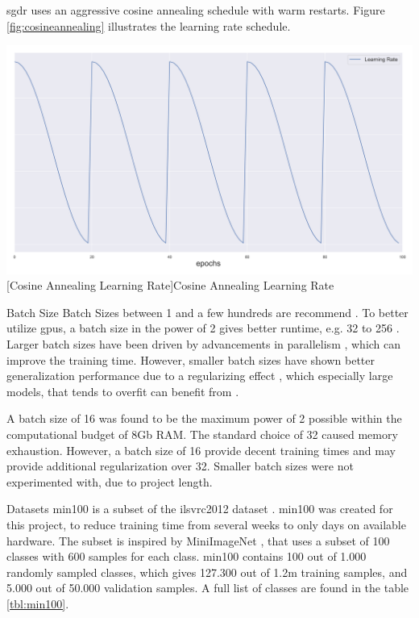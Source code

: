 \begin{enumdescript}
\begin{enumdescript}
		\gls{sgdr} uses an aggressive cosine annealing schedule with warm restarts. Figure \ref{fig:cosineannealing} illustrates the learning rate schedule.
		
		\begin{minipage}[t]{\linewidth}
			\centering
			\includegraphics[width=.7\linewidth]{figures/lr.png}
			[Cosine Annealing Learning Rate]{Cosine Annealing Learning Rate} 
			\label{fig:cosineannealing}
		\end{minipage}
		
		\item[Batch Size] Batch Sizes between 1 and a few hundreds are recommend \cite{bengio_practical_2012}. To better utilize \gls{gpu}s, a batch size in the power of 2 gives better runtime, e.g. 32 to 256 \cite{goodfellow_deep_2016}. Larger batch sizes have been driven by advancements in parallelism \cite{dean_large_2012}, which can improve the training time. However, smaller batch sizes have shown better generalization performance due to a regularizing effect \cite{masters_revisiting_nodate}, which especially large models, that tends to overfit can benefit from \cite{goodfellow_deep_2016}. 
		
		A batch size of 16 was found to be the maximum power of 2 possible within the computational budget of 8Gb RAM. The standard choice of 32 caused memory exhaustion. However, a batch size of 16 provide decent training times and may provide additional regularization over 32. Smaller batch sizes were not experimented with, due to project length.
		
		\item[Datasets] \gls{min100} is a subset of the \gls{ilsvrc2012} dataset \cite{russakovsky_imagenet_2015}. \gls{min100} was created for this project, to reduce training time from several weeks to only days on available hardware. The subset is inspired by MiniImageNet \cite{vinyals_matching_2016}, that uses a subset of 100 classes with 600 samples for each class. \gls{min100} contains 100 out of 1.000 randomly sampled classes, which gives 127.300 out of 1.2m training samples, and 5.000 out of 50.000 validation samples. A full list of classes are found in the table \ref{tbl:min100}. 
		

\end{enumdescript}
\end{enumdescript}
